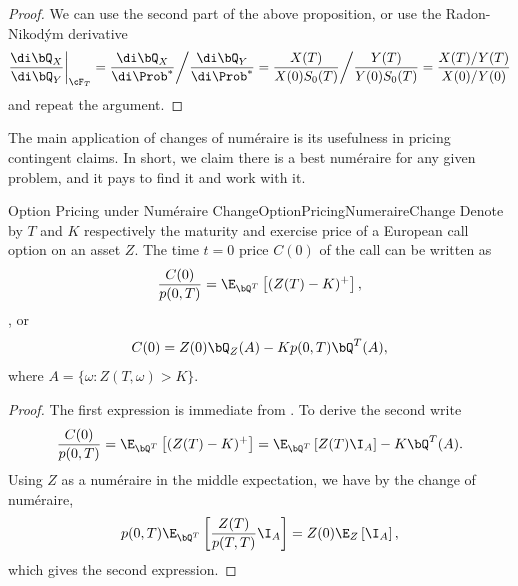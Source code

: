 \begin{proof}
	We can use the second part of the above proposition, or use the Radon-Nikodým derivative
	\[
		\frac{\di \bQ_X}{\di \bQ_Y} \bigg|_{\cF_T} = \frac{\di \bQ_X}{\di \Prob^*} \bigg/ \frac{\di \bQ_Y}{\di \Prob^*} = \frac{X(T)}{X(0)S_0(T)} \bigg/ \frac{Y(T)}{Y(0)S_0(T)} = \frac{X(T)/Y(T)}{X(0)/Y(0)}
	\]
	and repeat the argument.
\end{proof}

The main application of changes of num\'{e}raire is its usefulness in pricing contingent claims. In short, we claim there is a best num\'{e}raire for any given problem, and it pays to find it and work with it.

\begin{prop}{Option Pricing under Numéraire Change}{OptionPricingNumeraireChange}
	Denote by $T$ and $K$ respectively the maturity and exercise price of a European call option on an asset $Z$. The time $t=0$ price $C(0)$ of the call can be written as
	\[
		\frac{C(0)}{p(0,T)} = \E_{\bQ^T} \left[ (Z(T) - K)^+ \right],
	\],
	or
	\[
		C(0) = Z(0)\bQ_Z(A) - Kp(0,T)\bQ^T(A),
	\]
	where $A = \{ \omega : Z(T, \omega) > K \}$.
\end{prop}

\begin{proof}
	The first expression is immediate from . To derive the second write
	\[
		\frac{C(0)}{p(0,T)} = \E_{\bQ^T} \left[ (Z(T) - K)^+ \right] = \E_{\bQ^T} \left[ Z(T)\I_A \right] - K\bQ^T(A).
	\]
	Using $Z$ as a numéraire in the middle expectation, we have by the change of numéraire, 
	\[
		p(0,T)\E_{\bQ^T} \left[ \frac{Z(T)}{p(T,T)} \I_A \right] = Z(0)\E_Z \left[ \I_A \right],
	\]
	which gives the second expression.
\end{proof}



